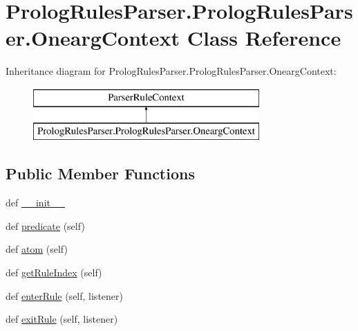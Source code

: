 \hypertarget{class_prolog_rules_parser_1_1_prolog_rules_parser_1_1_onearg_context}{}\section{Prolog\+Rules\+Parser.\+Prolog\+Rules\+Parser.\+Onearg\+Context Class Reference}
\label{class_prolog_rules_parser_1_1_prolog_rules_parser_1_1_onearg_context}
Inheritance diagram for Prolog\+Rules\+Parser.\+Prolog\+Rules\+Parser.\+Onearg\+Context\+:\begin{figure}[H]
\begin{center}
\leavevmode
\includegraphics[height=2.000000cm]{class_prolog_rules_parser_1_1_prolog_rules_parser_1_1_onearg_context}
\end{center}
\end{figure}
\subsection*{Public Member Functions}
\begin{DoxyCompactItemize}
\item 
def \hyperlink{class_prolog_rules_parser_1_1_prolog_rules_parser_1_1_onearg_context_a3bc8833fba8dc822918de0d55fcc430a}{\+\_\+\+\_\+init\+\_\+\+\_\+}
\item 
def \hyperlink{class_prolog_rules_parser_1_1_prolog_rules_parser_1_1_onearg_context_a4e847f53fcbea7cc7e54db1f36300027}{predicate} (self)
\item 
def \hyperlink{class_prolog_rules_parser_1_1_prolog_rules_parser_1_1_onearg_context_a28bfd2a3d58241a8225eb2eec4820702}{atom} (self)
\item 
def \hyperlink{class_prolog_rules_parser_1_1_prolog_rules_parser_1_1_onearg_context_ad68a1ac517b420c88645fba6f77ab47b}{get\+Rule\+Index} (self)
\item 
def \hyperlink{class_prolog_rules_parser_1_1_prolog_rules_parser_1_1_onearg_context_ae5fb9dd2d757ca626f9e44d2fc67a9ab}{enter\+Rule} (self, listener)
\item 
def \hyperlink{class_prolog_rules_parser_1_1_prolog_rules_parser_1_1_onearg_context_a9eaa5290d5837af9efed07393e65407b}{exit\+Rule} (self, listener)
\end{DoxyCompactItemize}
